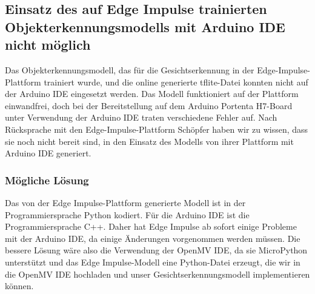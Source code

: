 \subsection{Einsatz des auf Edge Impulse trainierten Objekterkennungsmodells mit Arduino IDE nicht möglich }

Das Objekterkennungsmodell, das für die Gesichtserkennung in der Edge-Impulse-Plattform trainiert wurde, und die online generierte tflite-Datei konnten nicht auf der Arduino IDE eingesetzt werden. Das Modell funktioniert auf der Plattform einwandfrei, doch bei der Bereitstellung auf dem Arduino Portenta H7-Board unter Verwendung der Arduino IDE traten verschiedene Fehler auf. Nach Rücksprache mit den Edge-Impulse-Plattform Schöpfer haben wir zu wissen, dass sie noch nicht bereit sind, in den Einsatz des Modells von ihrer Plattform mit Arduino IDE generiert.

\subsubsection{Mögliche Lösung}

Das von der Edge Impulse-Plattform generierte Modell ist in der Programmiersprache Python kodiert. Für die Arduino IDE ist die Programmiersprache C++. Daher hat Edge Impulse ab sofort einige Probleme mit der Arduino IDE, da einige Änderungen vorgenommen werden müssen. Die bessere Lösung wäre also die Verwendung der OpenMV IDE, da sie MicroPython unterstützt und das Edge Impulse-Modell eine Python-Datei erzeugt, die wir in die OpenMV IDE hochladen und unser Gesichtserkennungsmodell implementieren können.



